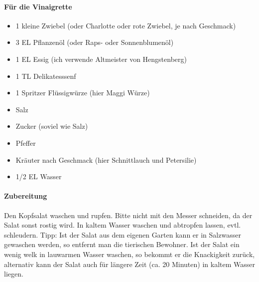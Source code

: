 \paragraph{Für die Vinaigrette}

\begin{itemize}[noitemsep]	
	\item 1 kleine Zwiebel  (oder Charlotte oder rote Zwiebel, je nach Geschmack)
	\item 3 EL Pflanzenöl (oder Raps- oder Sonnenblumenöl)
	\item 1 EL Essig (ich verwende Altmeister von Hengstenberg)
	\item 1 TL Delikatesssenf
	\item 1 Spritzer Flüssigwürze (hier Maggi Würze)
	\item Salz 
	\item Zucker (soviel wie Salz)
	\item Pfeffer
	\item Kräuter nach Geschmack (hier Schnittlauch und Petersilie)
	
	\item 1/2 EL Wasser
\end{itemize}

\paragraph{Zubereitung}

Den Kopfsalat waschen und rupfen. Bitte nicht mit den Messer schneiden, da der Salat sonst rostig wird. In kaltem Wasser waschen und 
abtropfen lassen, evtl. 
schleudern.
Tipp: Ist der Salat aus dem eigenen Garten kann er in Salzwasser gewaschen werden, so entfernt man die tierischen Bewohner. Ist der 
Salat ein wenig welk in 
lauwarmen 
Wasser waschen, so bekommt er die Knackigkeit zurück, alternativ kann der Salat auch für längere Zeit (ca. 20 Minuten) in kaltem 
Wasser liegen.

